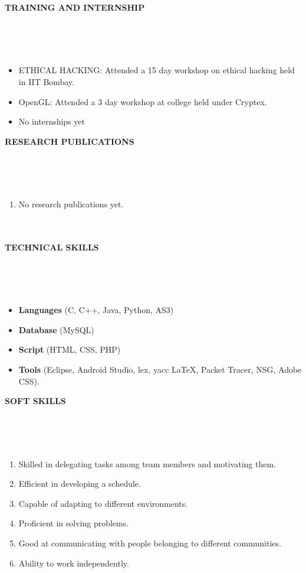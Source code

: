\documentclass[a4paper,10pt]{article}
\newcommand{\lsep}{-0.5cm}
\newcommand{\resheading}[1]{{\small \colorbox{mygrey}{\begin{minipage}{0.975\textwidth}{\textbf{#1 \vphantom{p\^{E}}}}\end{minipage}}}}
\begin{document}
\resheading{\textbf{TRAINING AND INTERNSHIP} }\\[\lsep]
\\ \\
\begin{itemize}
					\item ETHICAL HACKING: Attended a 15 day workshop on ethical hacking held in IIT Bombay.
					\item OpenGL:
					Attended a 3 day workshop at college held under Cryptex.
					\item No internships yet
\end{itemize}

\resheading{\textbf{RESEARCH PUBLICATIONS} }\\[\lsep]
\\ \\
\begin{enumerate}
		\item No research publications yet. \\ \\ \\
\end{enumerate}

\resheading{\textbf{TECHNICAL SKILLS} }\\[\lsep]
\\ \\
\begin{itemize}
	\item \noindent \textbf{Languages} (C, C++, Java, Python, AS3)
	\item \noindent \textbf{Database} (MySQL)
	\item \noindent \textbf{Script} (HTML, CSS, PHP) 
	\item \noindent \textbf{Tools} (Eclipse, Android Studio, lex, yacc \LaTeX, Packet Tracer, NSG, Adobe CSS).
	
\end{itemize}

\resheading{\textbf{SOFT SKILLS} }\\[\lsep]
\\ \\
\begin{enumerate}
		\item \noindent Skilled in delegating tasks among team members and motivating them.
		\item \noindent Efficient in developing a schedule.
		\item \noindent Capable of adapting to different environments.
		\item \noindent Proficient in solving problems.
		\item \noindent Good at communicating with people belonging to different communities.
		\item \noindent Ability to work independently.
\end{enumerate}
\end{document}
